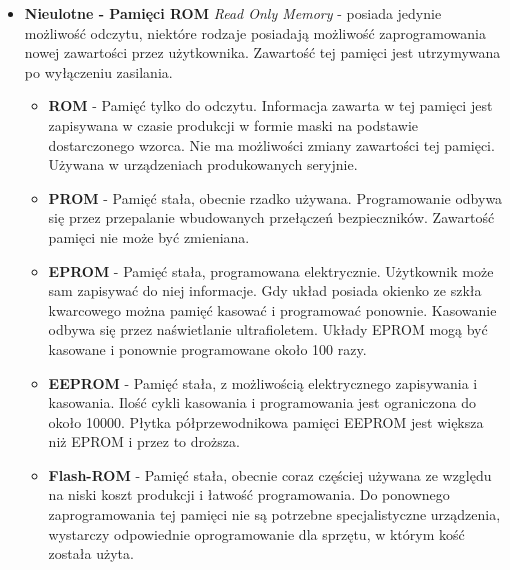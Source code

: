 \documentclass[12pt,a4paper]{article}
\begin{document}
		\begin{itemize}
		\item \textbf{Nieulotne - Pamięci ROM} \textit{Read Only Memory} - posiada jedynie możliwość odczytu, niektóre rodzaje posiadają możliwość zaprogramowania nowej zawartości przez użytkownika. Zawartość tej pamięci jest utrzymywana po wyłączeniu zasilania. 
		\begin{itemize}
			\item \textbf{ROM} - Pamięć tylko do odczytu. Informacja zawarta w tej pamięci jest zapisywana w czasie produkcji w formie maski na podstawie dostarczonego wzorca. Nie ma możliwości zmiany zawartości tej pamięci. Używana w urządzeniach produkowanych seryjnie. 
			\item \textbf{PROM} - Pamięć stała, obecnie rzadko używana. Programowanie odbywa się przez przepalanie wbudowanych przełączeń bezpieczników. Zawartość pamięci nie może być zmieniana. 
			\item \textbf{EPROM} - Pamięć stała, programowana elektrycznie. Użytkownik może sam zapisywać do niej informacje. Gdy układ posiada okienko ze szkła kwarcowego można pamięć kasować i programować ponownie. Kasowanie odbywa się przez naświetlanie ultrafioletem. Układy EPROM mogą być kasowane i ponownie programowane około 100 razy. 
			\item \textbf{EEPROM} - Pamięć stała, z możliwością elektrycznego zapisywania i kasowania. Ilość cykli kasowania i programowania jest ograniczona do około 10000. Płytka półprzewodnikowa pamięci EEPROM jest większa niż EPROM i przez to droższa. 
			\item \textbf{Flash-ROM} - Pamięć stała, obecnie coraz częściej używana ze względu na niski koszt produkcji i łatwość programowania. Do ponownego zaprogramowania tej pamięci nie są potrzebne specjalistyczne urządzenia, wystarczy odpowiednie oprogramowanie dla sprzętu, w którym kość została użyta.
		\end{itemize}
	\end{itemize}
	
\end{document}
